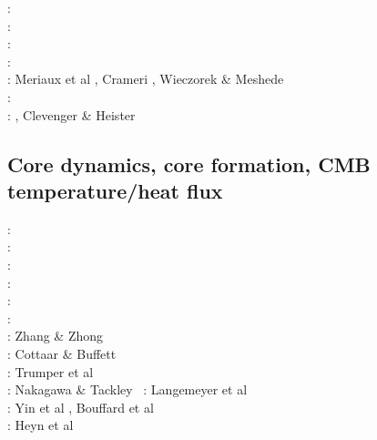 \begin{scriptsize}
\twothousandfourteen: \cite{thmk14}\cite{mabl14}\cite{lopp14}\cite{stlh14}\\
\twothousandfifteen: \cite{lelk15}\cite{rumi15}\cite{chpe15}\cite{mabl15}\\
\twothousandsixteen: \cite{dumy16}\cite{blmp16}\\
\twothousandseventeen: \cite{robh17}\cite{wisv17}\cite{majc17}\\
\twothousandeighteen: Meriaux et al \cite{memm18}, Crameri \cite{cram18}, Wieczorek \& Meshede \cite{wime18}\\
\twothousandnineteen: \cite{liki19}\cite{demh19}\cite{galb19}\cite{frtv19}\cite{yuwa19}\cite{ropu19}\\
\twothousandtwenty: \cite{homb20}\cite{trlb20}\cite{gadb20}\cite{jaca20a,jaca20b}, Clevenger \& Heister \cite{clhe20}
\end{scriptsize}

\subsection{Core dynamics, core formation, CMB temperature/heat flux}

\begin{scriptsize}
\nineteenninetysix: \cite{hayu96}\cite{boeh96}\\
\nineteenninetyeight: \cite{vayu98}\\
\twothousandfour: \cite{nata04c}\\
\twothousandeight: \cite{lahb08}\cite{gost08}\cite{sata08}\\
\twothousandnine: \cite{kisn09}\\
\twothousandten: \cite{nata10}\cite{lamg10}\cite{sate10}\\
\twothousandeleven: Zhang \& Zhong  \cite{zhzh11}\\
\twothousandtwelve: Cottaar \& Buffett  \cite{cobu12}\\
\twothousandtwelve: Trumper et al  \cite{trbh12}\\
\twothousandthirteen: Nakagawa \& Tackley  \cite{nata13}\
\twothousandeighteen: Langemeyer et al  \cite{lalt18}\\
\twothousandnineteen: Yin et al  \cite{yiym19}, Bouffard et al \cite{bocl19}\\
\twothousandtwenty: Heyn et al \cite{hect20}
\end{scriptsize}


